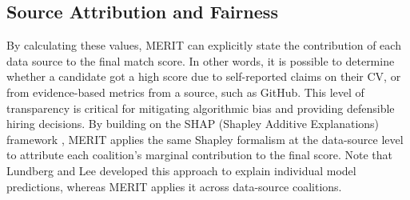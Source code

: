 \subsection*{Source Attribution and Fairness}
By calculating these values, MERIT can explicitly state the contribution of each data source to the final match score.
In other words, it is possible to determine whether a candidate got a high score due to self-reported claims on their CV, or from evidence-based metrics from a source, such as GitHub.
This level of transparency is critical for mitigating algorithmic bias and providing defensible hiring decisions.
By building on the SHAP (Shapley Additive Explanations) framework \cite{lundberg2017unified}, MERIT applies 
the same Shapley formalism at the data-source level to attribute each coalition's marginal contribution to the 
final score. Note that Lundberg and Lee developed this approach to explain individual model predictions, whereas 
MERIT applies it across data-source coalitions.
